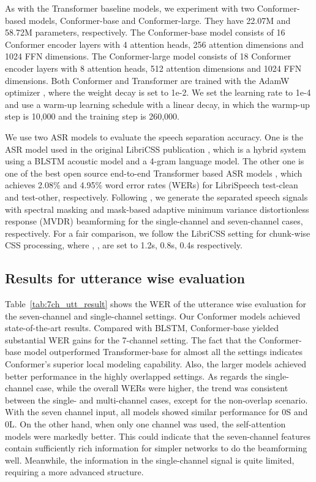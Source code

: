 \documentclass{article}
\begin{document}
	As with the Transformer baseline models, we experiment with two Conformer-based models, 
	Conformer-base and Conformer-large. They have 22.07M and 58.72M parameters, respectively. The Conformer-base model consists of 16 Conformer encoder layers with 4 attention heads, 256 attention dimensions and 1024 FFN dimensions. The Conformer-large model consists of 18 Conformer encoder layers with 8 attention heads, 512 attention dimensions and 1024 FFN dimensions. 
	Both Conformer and Transformer are trained with the AdamW optimizer \cite{loshchilov2018decoupled}, where the weight decay is set to 1e-2.
	We set the learning rate to 1e-4 and use a warm-up learning schedule with a linear decay, in which the warmp-up step is 10,000 and the training step is 260,000. 
	
	We use two ASR models to evaluate the speech separation accuracy. One is the ASR model used in the original LibriCSS publication \cite{chen2020continuous}, which is a hybrid system using a BLSTM acoustic model and a 4-gram language model. The other one is one of the best open source end-to-end Transformer  based ASR models \cite{wang2019semantic}, which achieves 2.08\% and 4.95\% word error rates (WERs) for LibriSpeech test-clean and test-other, respectively. Following \cite{chen2020continuous}, we generate the separated speech signals with  spectral masking and mask-based adaptive minimum variance distortionless response (MVDR) beamforming for the single-channel and seven-channel cases, respectively. 
	For a fair comparison, we follow the LibriCSS setting for chunk-wise CSS processing, where , ,  are set to 1.2s, 0.8s, 0.4s respectively.
	


	\subsection{Results for  utterance wise evaluation}
	
	Table~\ref{tab:7ch_utt_result} shows the WER of the utterance wise evaluation for the seven-channel and single-channel settings. 
	Our Conformer models achieved state-of-the-art results. Compared with BLSTM,  Conformer-base
	yielded substantial WER gains for the 7-channel setting.
The fact that 
	the Conformer-base model outperformed Transformer-base for almost all the settings indicates  Conformer's superior local modeling capability. Also, the larger models achieved better performance in the highly overlapped settings. 
As regards the single-channel case, 
	while the overall WERs were higher, 
the trend was consistent between the single- and multi-channel cases, except for the non-overlap scenario. With the seven channel input, all models showed similar performance for 0S and 0L.
	On the other hand, when only one channel was used,  
	the self-attention models were markedly better. This could indicate that the seven-channel features contain sufficiently rich information for simpler networks to do the beamforming well. Meanwhile, the information in the single-channel signal is quite limited, requiring a more advanced structure.
\end{document}

